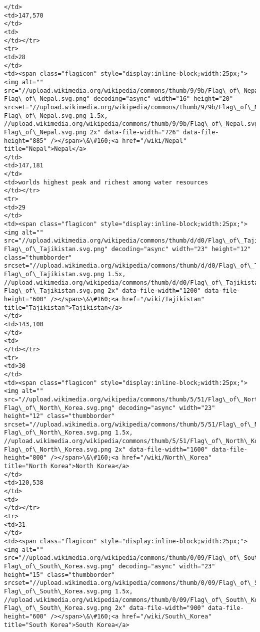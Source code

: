 \documentclass[11pt]{article}
\begin{document}
\begin{Verbatim}[commandchars=\\\{\}]
</td>
<td>147,570
</td>
<td>
</td></tr>
<tr>
<td>28
</td>
<td><span class="flagicon" style="display:inline-block;width:25px;"><img alt="" src="//upload.wikimedia.org/wikipedia/commons/thumb/9/9b/Flag\_of\_Nepal.svg/16px-Flag\_of\_Nepal.svg.png" decoding="async" width="16" height="20" srcset="//upload.wikimedia.org/wikipedia/commons/thumb/9/9b/Flag\_of\_Nepal.svg/25px-Flag\_of\_Nepal.svg.png 1.5x, //upload.wikimedia.org/wikipedia/commons/thumb/9/9b/Flag\_of\_Nepal.svg/33px-Flag\_of\_Nepal.svg.png 2x" data-file-width="726" data-file-height="885" /></span>\&\#160;<a href="/wiki/Nepal" title="Nepal">Nepal</a>
</td>
<td>147,181
</td>
<td>worlds highest peak and richest among water resources
</td></tr>
<tr>
<td>29
</td>
<td><span class="flagicon" style="display:inline-block;width:25px;"><img alt="" src="//upload.wikimedia.org/wikipedia/commons/thumb/d/d0/Flag\_of\_Tajikistan.svg/23px-Flag\_of\_Tajikistan.svg.png" decoding="async" width="23" height="12" class="thumbborder" srcset="//upload.wikimedia.org/wikipedia/commons/thumb/d/d0/Flag\_of\_Tajikistan.svg/35px-Flag\_of\_Tajikistan.svg.png 1.5x, //upload.wikimedia.org/wikipedia/commons/thumb/d/d0/Flag\_of\_Tajikistan.svg/46px-Flag\_of\_Tajikistan.svg.png 2x" data-file-width="1200" data-file-height="600" /></span>\&\#160;<a href="/wiki/Tajikistan" title="Tajikistan">Tajikistan</a>
</td>
<td>143,100
</td>
<td>
</td></tr>
<tr>
<td>30
</td>
<td><span class="flagicon" style="display:inline-block;width:25px;"><img alt="" src="//upload.wikimedia.org/wikipedia/commons/thumb/5/51/Flag\_of\_North\_Korea.svg/23px-Flag\_of\_North\_Korea.svg.png" decoding="async" width="23" height="12" class="thumbborder" srcset="//upload.wikimedia.org/wikipedia/commons/thumb/5/51/Flag\_of\_North\_Korea.svg/35px-Flag\_of\_North\_Korea.svg.png 1.5x, //upload.wikimedia.org/wikipedia/commons/thumb/5/51/Flag\_of\_North\_Korea.svg/46px-Flag\_of\_North\_Korea.svg.png 2x" data-file-width="1600" data-file-height="800" /></span>\&\#160;<a href="/wiki/North\_Korea" title="North Korea">North Korea</a>
</td>
<td>120,538
</td>
<td>
</td></tr>
<tr>
<td>31
</td>
<td><span class="flagicon" style="display:inline-block;width:25px;"><img alt="" src="//upload.wikimedia.org/wikipedia/commons/thumb/0/09/Flag\_of\_South\_Korea.svg/23px-Flag\_of\_South\_Korea.svg.png" decoding="async" width="23" height="15" class="thumbborder" srcset="//upload.wikimedia.org/wikipedia/commons/thumb/0/09/Flag\_of\_South\_Korea.svg/35px-Flag\_of\_South\_Korea.svg.png 1.5x, //upload.wikimedia.org/wikipedia/commons/thumb/0/09/Flag\_of\_South\_Korea.svg/45px-Flag\_of\_South\_Korea.svg.png 2x" data-file-width="900" data-file-height="600" /></span>\&\#160;<a href="/wiki/South\_Korea" title="South Korea">South Korea</a>

\end{Verbatim}
\end{document}
